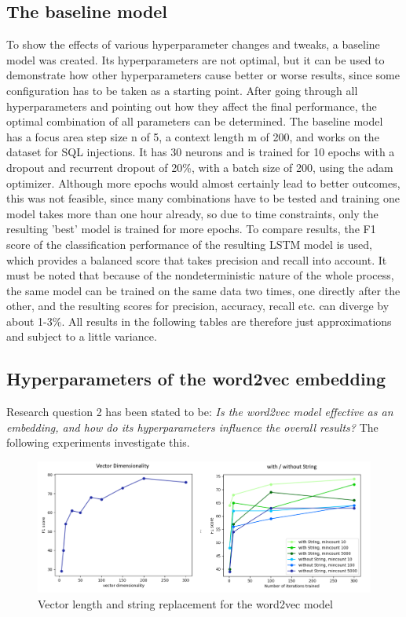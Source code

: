 \documentclass[
a4paper,
pagesize,
pdftex,
12pt,
twoside, %
BCOR=5mm, %
ngerman,
fleqn,
final,
]{scrartcl}
\begin{document}
	
	\subsection{The baseline model}\label{baseline}
	To show the effects of various hyperparameter changes and tweaks, a baseline model was created. Its hyperparameters are not optimal, but it can be used to demonstrate how other hyperparameters cause better or worse results, since some configuration has to be taken as a starting point. After going through all hyperparameters and pointing out how they affect the final performance, the optimal combination of all parameters can be determined. The baseline model has a focus area step size n of 5, a context length m of 200, and works on the dataset for SQL injections. It has 30 neurons and is trained for 10 epochs with a dropout and recurrent dropout of 20\%, with a batch size of 200, using the adam optimizer. Although more epochs would almost certainly lead to better outcomes, this was not feasible, since many combinations have to be tested and training one model takes more than one hour already, so due to time constraints, only the resulting 'best' model is trained for more epochs. To compare results, the F1 score of the classification performance of the resulting LSTM  model is used, which provides a balanced score that takes precision and recall into account. It must be noted that because of the nondeterministic nature of the whole process, the same model can be trained on the same data two times, one directly after the other, and the resulting scores for precision, accuracy, recall etc. can diverge by about 1-3\%. All results in the following tables are therefore just approximations and subject to a little variance. 
	
	\subsection{Hyperparameters of the word2vec embedding}
	
	Research question 2 has been stated to be: \textit{Is the word2vec model effective as an embedding, and how do its hyperparameters influence the overall results?} The following experiments investigate this. 
	
	\begin{figure}[h]
		\centering
		\includegraphics[width=1\textwidth]{img/word2vecHyper2}
		\caption{Vector length and string replacement for the word2vec model}
		\label{fig:w2vhyper2}
	\end{figure}
	
\end{document}
